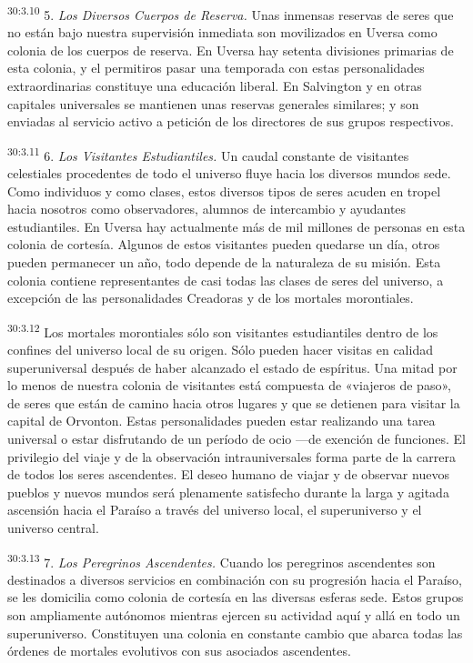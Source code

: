 \par
\textsuperscript{30:3.10} 5. \textit{Los Diversos Cuerpos de Reserva.} Unas inmensas reservas de seres que no están bajo nuestra supervisión inmediata son movilizados en Uversa como colonia de los cuerpos de reserva. En Uversa hay setenta divisiones primarias de esta colonia, y el permitiros pasar una temporada con estas personalidades extraordinarias constituye una educación liberal. En Salvington y en otras capitales universales se mantienen unas reservas generales similares; y son enviadas al servicio activo a petición de los directores de sus grupos respectivos.

\par
\textsuperscript{30:3.11} 6. \textit{Los Visitantes Estudiantiles.} Un caudal constante de visitantes celestiales procedentes de todo el universo fluye hacia los diversos mundos sede. Como individuos y como clases, estos diversos tipos de seres acuden en tropel hacia nosotros como observadores, alumnos de intercambio y ayudantes estudiantiles. En Uversa hay actualmente más de mil millones de personas en esta colonia de cortesía. Algunos de estos visitantes pueden quedarse un día, otros pueden permanecer un año, todo depende de la naturaleza de su misión. Esta colonia contiene representantes de casi todas las clases de seres del universo, a excepción de las personalidades Creadoras y de los mortales morontiales.

\par
\textsuperscript{30:3.12} Los mortales morontiales sólo son visitantes estudiantiles dentro de los confines del universo local de su origen. Sólo pueden hacer visitas en calidad superuniversal después de haber alcanzado el estado de espíritus. Una mitad por lo menos de nuestra colonia de visitantes está compuesta de «viajeros de paso», de seres que están de camino hacia otros lugares y que se detienen para visitar la capital de Orvonton. Estas personalidades pueden estar realizando una tarea universal o estar disfrutando de un período de ocio ---de exención de funciones. El privilegio del viaje y de la observación intrauniversales forma parte de la carrera de todos los seres ascendentes. El deseo humano de viajar y de observar nuevos pueblos y nuevos mundos será plenamente satisfecho durante la larga y agitada ascensión hacia el Paraíso a través del universo local, el superuniverso y el universo central.

\par
\textsuperscript{30:3.13} 7. \textit{Los Peregrinos Ascendentes.} Cuando los peregrinos ascendentes son destinados a diversos servicios en combinación con su progresión hacia el Paraíso, se les domicilia como colonia de cortesía en las diversas esferas sede. Estos grupos son ampliamente autónomos mientras ejercen su actividad aquí y allá en todo un superuniverso. Constituyen una colonia en constante cambio que abarca todas las órdenes de mortales evolutivos con sus asociados ascendentes.

